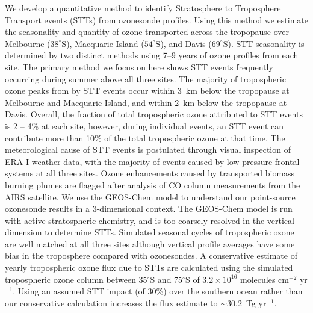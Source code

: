   We develop a quantitative method to identify Stratosphere to Troposphere Transport events (STTs) from ozonesonde profiles. 
  Using this method we estimate the seasonality and quantity of ozone transported across the tropopause over Melbourne ($38^\circ$S), Macquarie Island ($54^\circ$S), and Davis ($69^\circ$S).
  STT seasonality is determined by two distinct methods using 7--9 years of ozone profiles from each site.
  The primary method we focus on here shows STT events frequently occurring during summer above all three sites.
  The majority of tropospheric ozone peaks from by STT events occur within 3~km below the tropopause at Melbourne and Macquarie Island, and within 2~km below the tropopause at Davis.
  Overall, the fraction of total tropospheric ozone attributed to STT events is 2 – 4\% at each site, however, during individual events, an STT event can contribute more than 10\% of the total tropospheric ozone at that time.
  The meteorological cause of STT events is postulated through visual inspection of ERA-I weather data, with the majority of events caused by low pressure frontal systems at all three sites.
  Ozone enhancements caused by transported biomass burning plumes are flagged after analysis of CO column measurements from the AIRS satellite.
  We use the GEOS-Chem model to understand our point-source ozonesonde results in a 3-dimensional context.
  The GEOS-Chem model is run with active stratospheric chemistry, and is too coarsely resolved in the vertical dimension to determine STTs.
  Simulated seasonal cycles of tropospheric ozone are well matched at all three sites although vertical profile averages have some bias in the troposphere compared with ozonesondes.
  A conservative estimate of yearly tropospheric ozone flux due to STTs are calculated using the simulated tropospheric ozone column between 35$^\circ$S and 75$^\circ$S of $3.2\times10^{16}$ molecules cm$^{-2}$ yr$^{-1}$.
  Using an assumed STT impact (of 30\%) over the southern ocean rather than our conservative calculation increases the flux estimate to $\sim$30.2~Tg yr$^{-1}$.
  